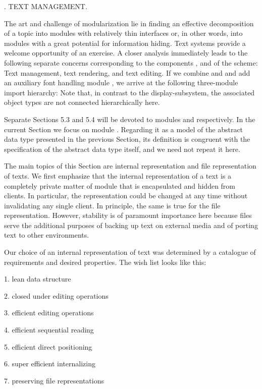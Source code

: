 . TEXT MANAGEMENT.

The art and challenge of modularization lie in finding an effective decomposition of a topic into modules with relatively thin interfaces or, in other words, into modules with a great potential for information hiding. Text systems provide a welcome opportunity of an exercise. A closer analysis immediately leads to the following separate concerns corresponding to the components ,  and  of the  scheme: Text management, text rendering, and text editing. If we combine  and  and add an auxiliary font handling module , we arrive at the following three-module import hierarchy:
\medskip
{}\medskip
Note that, in contrast to the display-subsystem, the associated object
types are not connected hierarchically here.

Separate Sections 5.3 and 5.4 will be devoted to modules 
and  respectively. In the current Section
we focus on module . Regarding it as a model of the
abstract data type  presented in the previous Section, its
definition is congruent with the specification of the abstract data
type itself, and we need not repeat it here.

The main topics of this Section are internal representation and file
representation of texts. We first emphasize that the internal
representation of a text is a completely private matter of module
 that is encapsulated and hidden from clients. In particular, the representation could be changed at any time without invalidating any
single client. In principle, the same is true for the file
representation. However, stability is of paramount importance here
because files serve the additional purposes of backing up text on
external media and of porting text to other environments.

Our choice of an internal representation of text was determined by a catalogue of requirements and desired properties. The wish list looks like this:

\item{1.} lean data structure
\item{2.} closed under editing operations
\item{3.} efficient editing operations
\item{4.} efficient sequential reading
\item{5.} efficient direct positioning
\item{6.} super efficient internalizing
\item{7.} preserving file representations

